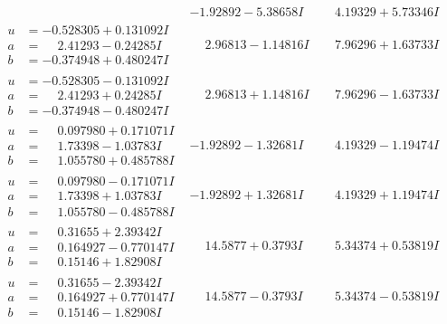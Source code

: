 \documentclass[1p]{elsarticle_modified}
\theoremstyle{definition}
\begin{document}
$$\begin{array}{c|c|c}
 & -1.92892 - 5.38658 I & \phantom{-}4.19329 + 5.73346 I \\ \hline\begin{aligned}
u &= -0.528305 + 0.131092 I \\
a &= \phantom{-}2.41293 - 0.24285 I \\
b &= -0.374948 + 0.480247 I\end{aligned}
 & \phantom{-}2.96813 - 1.14816 I & \phantom{-}7.96296 + 1.63733 I \\ \hline\begin{aligned}
u &= -0.528305 - 0.131092 I \\
a &= \phantom{-}2.41293 + 0.24285 I \\
b &= -0.374948 - 0.480247 I\end{aligned}
 & \phantom{-}2.96813 + 1.14816 I & \phantom{-}7.96296 - 1.63733 I \\ \hline\begin{aligned}
u &= \phantom{-}0.097980 + 0.171071 I \\
a &= \phantom{-}1.73398 - 1.03783 I \\
b &= \phantom{-}1.055780 + 0.485788 I\end{aligned}
 & -1.92892 - 1.32681 I & \phantom{-}4.19329 - 1.19474 I \\ \hline\begin{aligned}
u &= \phantom{-}0.097980 - 0.171071 I \\
a &= \phantom{-}1.73398 + 1.03783 I \\
b &= \phantom{-}1.055780 - 0.485788 I\end{aligned}
 & -1.92892 + 1.32681 I & \phantom{-}4.19329 + 1.19474 I \\ \hline\begin{aligned}
u &= \phantom{-}0.31655 + 2.39342 I \\
a &= \phantom{-}0.164927 - 0.770147 I \\
b &= \phantom{-}0.15146 + 1.82908 I\end{aligned}
 & \phantom{-}14.5877 + 0.3793 I & \phantom{-}5.34374 + 0.53819 I \\ \hline\begin{aligned}
u &= \phantom{-}0.31655 - 2.39342 I \\
a &= \phantom{-}0.164927 + 0.770147 I \\
b &= \phantom{-}0.15146 - 1.82908 I\end{aligned}
 & \phantom{-}14.5877 - 0.3793 I & \phantom{-}5.34374 - 0.53819 I \\ \hline\begin{aligned}

\end{aligned}
\end{array}$$
\end{document}
